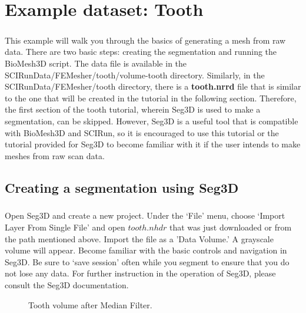 \documentclass[fleqn,12pt,openany]{book}
\begin{document}
\chapter{Example dataset: Tooth}
\label{chapter:tooth}
\paragraph{}
This example will walk you through the basics of generating a mesh from raw data. 
There are two basic steps: creating the segmentation and running the BioMesh3D 
script. The data file is available in the SCIRunData/FEMesher/tooth/volume-tooth 
directory. Similarly, in the SCIRunData/FEMesher/tooth directory, there is a 
{\bf tooth.nrrd} file that is similar to the one that will be created in the 
tutorial in the following section. Therefore, the first section of the tooth 
tutorial, wherein Seg3D is used to make a segmentation, can be skipped.
However, Seg3D is a useful tool that is compatible with BioMesh3D and SCIRun,
so it is encouraged to use this tutorial or the tutorial provided for Seg3D to
become familiar with it if the user intends to make meshes from raw scan data.

\section{Creating a segmentation using Seg3D}

\paragraph{}
Open Seg3D and create a new project. Under the `File' menu, choose `Import Layer From Single File' and open $tooth.nhdr$ that was just downloaded or from the path mentioned above. Import
the file as a 'Data Volume.' A grayscale volume 
will appear. Become familiar with the basic controls and navigation in Seg3D.  
Be sure to `save session' often while you segment to ensure that you do not lose 
any data. For further instruction in the operation of Seg3D, please consult 
the Seg3D documentation.

\begin{figure}
\caption{\label{fig:tooth_filtered} Tooth volume after Median Filter.}
\end{figure} 
 
\end{document}
